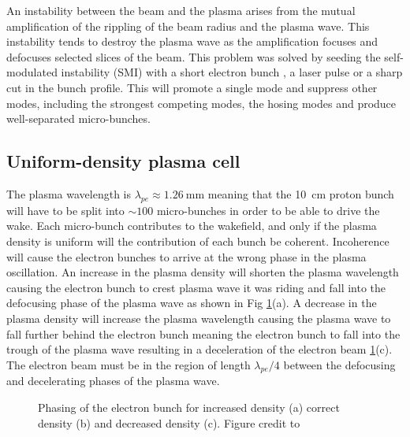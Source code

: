 \documentclass[a4paper]{report}
\begin{document}
An instability between the beam and the plasma arises from the mutual
amplification of the rippling of the beam radius and the plasma wave. This
instability tends to destroy the plasma wave as the amplification focuses and
defocuses selected slices of the beam.  This problem was solved by seeding the
self-modulated instability (SMI) with a short electron bunch
\cite{lotov2013natural}, a laser pulse \cite{siemon2013laser} or a sharp cut in
the bunch profile\cite{kumar2010self}. This will promote a single mode and
suppress other modes, including the strongest competing modes, the hosing modes
\cite{vieira2014hosing} and produce well-separated micro-bunches.

\subsection{Uniform-density plasma cell}

The plasma wavelength is \(\lambda_{pe} \approx \SI{1.26}{\milli\meter}\)
meaning that the \SI{10}{\centi\meter} proton bunch will have to be split into
\(\sim 100\) micro-bunches in order to be able to drive the wake.  Each
micro-bunch contributes to the wakefield, and only if the plasma density is
uniform will the contribution of each bunch be coherent. Incoherence will cause
the electron bunches to arrive at the wrong phase in the plasma oscillation. An
increase in the plasma density will shorten the plasma wavelength causing the
electron bunch to crest plasma wave it was riding and fall into the defocusing
phase of the plasma wave as shown in Fig \ref{fig:plasma_phase}(a). A decrease
in the plasma density will increase the plasma wavelength causing the plasma
wave to fall further behind the electron bunch meaning the electron bunch to
fall into the trough of the plasma wave resulting in a deceleration of the
electron beam \ref{fig:plasma_phase}(c). The electron beam must be in the
region of length \(\lambda_{pe}/4\) between the defocusing and decelerating
phases of the plasma wave.

\begin{figure}[!t]
	\centering
	\caption{Phasing of the electron bunch for increased density (a) correct
		density (b) and decreased density (c). Figure credit to
		\cite{caldwell2015rkk}}
	\label{fig:plasma_phase}
\end{figure}
\end{document}
